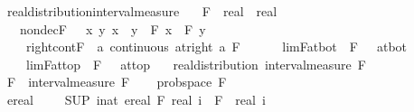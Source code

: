 \documentclass{article}
\theoremstyle{definition}
\begin{document}
\begin{isabellebody}
\isamarkupfalse%
\ real{\isacharunderscore}distribution{\isacharunderscore}interval{\isacharunderscore}measure{\isacharcolon}\isanewline
\ \ \ F\ {\isacharcolon}{\isacharcolon}\ {\isachardoublequoteopen}real\ {\isasymRightarrow}\ real{\isachardoublequoteclose}\isanewline
\ \ \ nondecF\ {\isacharcolon}\ {\isachardoublequoteopen}{\isasymAnd}\ x\ y{\isachardot}\ x\ {\isasymle}\ y\ {\isasymLongrightarrow}\ F\ x\ {\isasymle}\ F\ y{\isachardoublequoteclose}\ \isanewline
\ \ \ \ right{\isacharunderscore}cont{\isacharunderscore}F\ {\isacharcolon}\ {\isachardoublequoteopen}{\isasymAnd}a{\isachardot}\ continuous\ {\isacharparenleft}at{\isacharunderscore}right\ a{\isacharparenright}\ F{\isachardoublequoteclose}\ \ \isanewline
\ \ \ \ lim{\isacharunderscore}F{\isacharunderscore}at{\isacharunderscore}bot\ {\isacharcolon}\ {\isachardoublequoteopen}{\isacharparenleft}F\ {\isacharminus}{\isacharminus}{\isacharminus}{\isachargreater}\ {}{\isacharparenright}\ at{\isacharunderscore}bot{\isachardoublequoteclose}\ \isanewline
\ \ \ \ lim{\isacharunderscore}F{\isacharunderscore}at{\isacharunderscore}top\ {\isacharcolon}\ {\isachardoublequoteopen}{\isacharparenleft}F\ {\isacharminus}{\isacharminus}{\isacharminus}{\isachargreater}\ {}{\isacharparenright}\ at{\isacharunderscore}top{\isachardoublequoteclose}\isanewline
\ \ \ {\isachardoublequoteopen}real{\isacharunderscore}distribution\ {\isacharparenleft}interval{\isacharunderscore}measure\ F{\isacharparenright}{\isachardoublequoteclose}\isanewline
{}\isamarkupfalse%
\ {\isacharminus}\isanewline
\ \ \isamarkupfalse%
\ {\isacharquery}F\ {\isacharequal}\ {\isachardoublequoteopen}interval{\isacharunderscore}measure\ F{\isachardoublequoteclose}\isanewline
\ \ \isamarkupfalse%
\ prob{\isacharunderscore}space\ {\isacharquery}F\isanewline
\ \ \isamarkupfalse%
\isanewline
\ \ \ \ \isamarkupfalse%
\ {\isachardoublequoteopen}ereal\ {\isacharparenleft}{}\ {\isacharminus}\ {}{\isacharparenright}\ {\isacharequal}\ {\isacharparenleft}SUP\ i{\isacharcolon}{\isacharcolon}nat{\isachardot}\ ereal\ {\isacharparenleft}F\ {\isacharparenleft}real\ i{\isacharparenright}\ {\isacharminus}\ F\ {\isacharparenleft}{\isacharminus}\ real\ i{\isacharparenright}{\isacharparenright}{\isacharparenright}{\isachardoublequoteclose}\isanewline
\ \ \ \ \ \ \isamarkupfalse%

\end{isabellebody}
\end{document}
